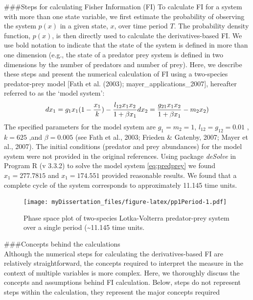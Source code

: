 \documentclass[12pt,twoside]{reedthesis}
\begin{document}
\#\#\#Steps for calculating Fisher Information (FI)
To calculate FI for a system with more than one state variable, we first estimate the probability of observing the system \(p(x)\) in a given state, \(x\), over time period \(T\). The probability density function, \(p(x)\), is then directly used to calculate the derivatives-based FI. We use bold notation to indicate that the state of the system is defined in more than one dimension (e.g., the state of a predator prey system is defined in two dimensions by the number of predators and number of prey). Here, we describe these steps and present the numerical calculation of FI using a two-species predator-prey model {[}Fath et al. (2003); mayer\_applications\_2007{]}, hereafter referred to as the `model system':
\begin{equation} 
  dx_1 = g_{1}x_{1}(1-\frac{x_1}{k})- \frac{l_{12} x_{1} x_{2}}{1+\beta x_{1}} \\
  dx_2 = \frac{g_{21}x_1 x_2}{1+\beta x_1} - m_2 x_2) \\
  \label{eq:predprey}
\end{equation}
The specified parameters for the model system are \(g_1=m_2=1\), \(l_12=g_12 = 0.01\) , \(k=625\) ,and \(\beta=0.005\) (see Fath et al., 2003; Frieden \& Gatenby, 2007; Mayer et al., 2007). The initial conditions (predator and prey abundances) for the model system were not provided in the original references. Using package \emph{deSolve} in Program R (v 3.3.2) to solve the model system \eqref{eq:predprey} we found \(x_1 = 277.7815\) and \(x_1= 174.551\) provided reasonable results. We found that a complete cycle of the system corresponds to approximately 11.145 time units.
\begin{figure}
\centering
\texttt{[image: myDissertation\_files/figure-latex/pp1Period-1.pdf]}
\caption{\label{fig:pp1Period}Phase space plot of two-species Lotka-Volterra predator-prey system over a single period (\textasciitilde{}11.145 time units.}
\end{figure}
\#\#\#Concepts behind the calculations\\
Although the numerical steps for calculating the derivatives-based FI are relatively straightforward, the concepts required to interpret the measure in the context of multiple variables is more complex. Here, we thoroughly discuss the concepts and assumptions behind FI calculation. Below, steps do not represent steps within the calculation, they represent the major concepts required
\end{document}
